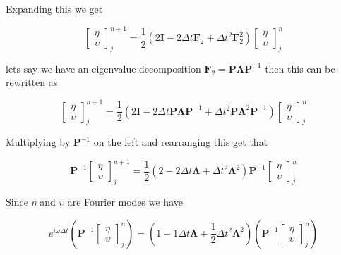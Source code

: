 Expanding this we get

\begin{equation*}
\left[\begin{array}{c}
\eta \\ \upsilon
\end{array}\right]^{n+1}_j = \frac{1}{2} \left(2\boldsymbol{I}  -2\Delta t\boldsymbol{F}_2 + \Delta t^2\boldsymbol{F}^2_2 \right) \left[\begin{array}{c}
\eta \\ \upsilon
\end{array}\right]^{n}_j 
\end{equation*}

lets say we have an eigenvalue decomposition $\boldsymbol{F}_2 = \boldsymbol{P} \boldsymbol{\Lambda} \boldsymbol{P}^{-1} $ then this can be rewritten as 

\begin{equation*}
\left[\begin{array}{c}
\eta \\ \upsilon
\end{array}\right]^{n+1}_j = \frac{1}{2} \left(2\boldsymbol{I}  -2\Delta t\boldsymbol{P} \boldsymbol{\Lambda} \boldsymbol{P}^{-1}  + \Delta t^2\boldsymbol{P} \boldsymbol{\Lambda}^2 \boldsymbol{P}^{-1} \right) \left[\begin{array}{c}
\eta \\ \upsilon
\end{array}\right]^{n}_j 
\end{equation*}

Multiplying by $\boldsymbol{P}^{-1}$ on the left and rearranging this get that

\begin{equation*}
\boldsymbol{P}^{-1} \left[\begin{array}{c}
\eta \\ \upsilon
\end{array}\right]^{n+1}_j = \frac{1}{2} \left(2 -2\Delta t \boldsymbol{\Lambda}  + \Delta t^2 \boldsymbol{\Lambda}^2  \right)  \boldsymbol{P}^{-1} \left[\begin{array}{c}
\eta \\ \upsilon
\end{array}\right]^{n}_j 
\end{equation*}

Since $\eta$ and $\upsilon$ are Fourier modes we have

\begin{equation*}
e^{i\omega \Delta t} \left(\boldsymbol{P}^{-1} \left[\begin{array}{c}
\eta \\ \upsilon
\end{array}\right]^{n}_j  \right)= \left(1 -1\Delta t \boldsymbol{\Lambda}  + \frac{1}{2}\Delta t^2 \boldsymbol{\Lambda}^2  \right)  \left(\boldsymbol{P}^{-1} \left[\begin{array}{c}
\eta \\ \upsilon
\end{array}\right]^{n}_j  \right)
\end{equation*}

